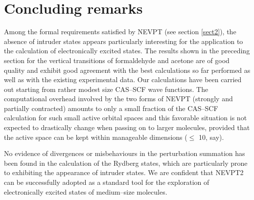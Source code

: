 \documentclass[global,referee]{svjour}
\begin{document}
\section{Concluding remarks\label{sect4}}
Among the formal requirements satisfied by NEVPT (see section
\ref{sect2}), the absence of intruder states appears particularly
interesting for the application to the calculation of electronically
excited states. The results shown in the preceding section for the
vertical transitions of formaldehyde and acetone are of good quality
and exhibit good agreement with the best calculations so far performed
as well as with the existing experimental data. Our
calculations have been carried out starting from rather modest size
CAS--SCF wave functions. The computational overhead involved by the
two forms of NEVPT (strongly and partially contracted) amounts to only
a small fraction of the CAS--SCF calculation for such small active
orbital spaces and this favorable situation is not expected to
drastically change when passing on to larger molecules, provided that
the active space can be kept within manageable dimensions ($\le$ 10,
say).

No evidence of divergences or misbehaviours in the perturbation
summation has been found in the calculation of the Rydberg states,
which are particularly prone to exhibiting the appearance of intruder
states. We are confident that NEVPT2 can be successfully adopted as a
standard tool for the exploration of electronically excited states of
medium--size molecules.





\end{document}

